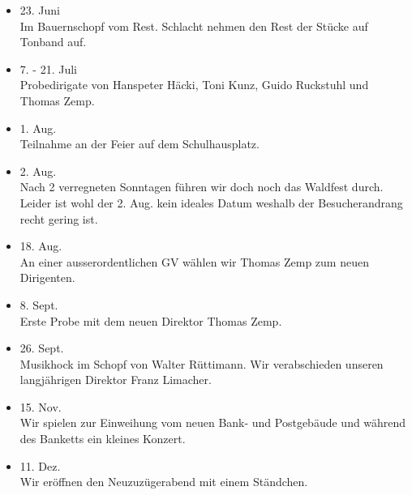 \begin{history}
\begin{itemize}
        \item 23. Juni\\
              Im Bauernschopf vom Rest. Schlacht nehmen den Rest der Stücke auf
              Tonband auf.

        \item 7. - 21. Juli\\
              Probedirigate von Hanspeter Häcki, Toni Kunz, Guido Ruckstuhl und Thomas
              Zemp.

        \item 1. Aug.\\
              Teilnahme an der Feier auf dem Schulhausplatz.

        \item 2. Aug.\\
              Nach 2 verregneten Sonntagen führen wir doch noch das Waldfest durch.
              Leider ist wohl der 2. Aug. kein ideales Datum weshalb der
              Besucherandrang recht gering ist.

        \item 18. Aug.\\
              An einer ausserordentlichen GV wählen wir Thomas Zemp zum neuen
              Dirigenten.

        \item 8. Sept.\\
              Erste Probe mit dem neuen Direktor Thomas Zemp.

        \item 26. Sept.\\
              Musikhock im Schopf von Walter Rüttimann. Wir verabschieden unseren
              langjährigen Direktor Franz Limacher.

        \item 15. Nov.\\
              Wir spielen zur Einweihung vom neuen Bank- und Postgebäude und während
              des Banketts ein kleines Konzert.

        \item 11. Dez.\\
              Wir eröffnen den Neuzuzügerabend mit einem Ständchen.


    \end{itemize}

\end{history}
